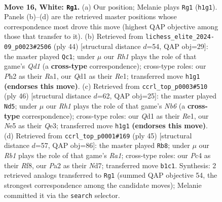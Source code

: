 \documentclass[11pt]{article}
\begin{document}
\clearpage

\begin{figure}[p]\centering
\begin{subfigure}{0.46\textwidth}\centering
\resizebox{\linewidth}{!}{%
\newchessgame
\chessboard[
  setfen={2kr3r/ppp2ppp/3qp3/4N3/2PP4/8/PP2KPbP/1R1Q3R w - - 0 16},
  showmover=false,
  pgfstyle=straightmove, color=movearrow, markmove={h1-g1}
]}
\caption{}
\end{subfigure}\hfill
\begin{subfigure}{0.46\textwidth}\centering
\resizebox{\linewidth}{!}{%
\newchessgame
\chessboard[
  setfen={3r1rk1/pp3ppp/7q/4N2b/2PP4/2P4P/5PP1/R2QR1K1 w - - 1 23},
  showmover=false,
  pgfstyle=straightmove, color=movearrow, markmove={d1-c1}
]}
\caption{}
\end{subfigure}
\\[4pt]
\begin{subfigure}{0.46\textwidth}\centering
\resizebox{\linewidth}{!}{%
\newchessgame
\chessboard[
  setfen={1r3rk1/1pq1ppbp/1N4p1/p1P1P3/P7/4QR2/1P4PP/4R1K1 w - - 0 24},
  showmover=false,
  pgfstyle=straightmove, color=movearrow, markmove={b6-d5}
]}
\caption{}
\end{subfigure}\hfill
\begin{subfigure}{0.46\textwidth}\centering
\resizebox{\linewidth}{!}{%
\newchessgame
\chessboard[
  setfen={r3qr1k/3n2pp/p2p4/N2Pp3/2B2n2/4QP2/PP5P/1KRR4 b - - 2 23},
  showmover=false,
  pgfstyle=straightmove, color=movearrow, markmove={a8-b8}
]}
\caption{}
\end{subfigure}
\caption{\textbf{Move 16, White: \texttt{Rg1}.} (a) Our position; Melanie plays \texttt{Rg1} (\texttt{h1g1}). Panels (b)--(d) are the retrieved master positions whose correspondence most drove this move (highest QAP objective among those that transfer to it). (b) Retrieved from \texttt{lichess\_elite\_2024-09\_p0023\#2506} (ply 44) [structural distance $d$=54, QAP obj=29]: the master played \texttt{Qc1}; under $\mu$ our \emph{Rh1} plays the role of that game's \emph{Qd1} (a \textbf{cross-type} correspondence); cross-type roles: our \emph{P}h2 as their \emph{R}a1, our \emph{Q}d1 as their \emph{R}e1; transferred move \texttt{h1g1} \textbf{(endorses this move)}. (c) Retrieved from \texttt{ccrl\_top\_p0003\#510} (ply 46) [structural distance $d$=62, QAP obj=25]: the master played \texttt{Nd5}; under $\mu$ our \emph{Rh1} plays the role of that game's \emph{Nb6} (a \textbf{cross-type} correspondence); cross-type roles: our \emph{Q}d1 as their \emph{R}e1, our \emph{N}e5 as their \emph{Q}e3; transferred move \texttt{h1g1} \textbf{(endorses this move)}. (d) Retrieved from \texttt{ccrl\_top\_p0001\#169} (ply 45) [structural distance $d$=57, QAP obj=86]: the master played \texttt{Rb8}; under $\mu$ our \emph{Rb1} plays the role of that game's \emph{Ra1}; cross-type roles: our \emph{P}c4 as their \emph{R}f8, our \emph{P}a2 as their \emph{N}d7; transferred move \texttt{b1c1}. Synthesis: 2 retrieved analogs transferred to \texttt{Rg1} (summed QAP objective 54, the strongest correspondence among the candidate moves); Melanie committed it via the \texttt{search} selector.}
\label{fig:thought-m30}
\end{figure}
\end{document}
